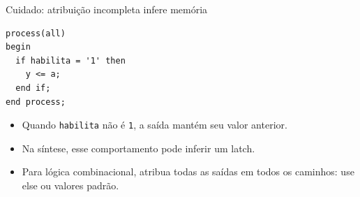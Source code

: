 \begin{frame}[fragile,t]{Cuidado: atribuição incompleta infere memória}
\begin{lstlisting}
process(all)
begin
  if habilita = '1' then
    y <= a;
  end if;
end process;
\end{lstlisting}\begin{itemize}
\item Quando \texttt{habilita} não é \texttt{1}, a saída mantém seu valor anterior.
\item Na síntese, esse comportamento pode inferir um latch.
\item Para lógica combinacional, atribua todas as saídas em todos os caminhos: use else ou valores padrão.
\end{itemize}
\end{frame}
